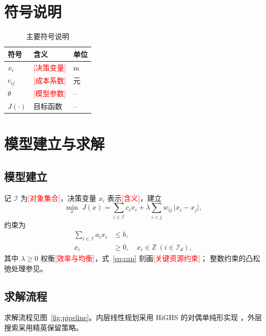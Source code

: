 \documentclass[UTF8, zihao=-4, fontset=windows, a4paper]{ctexart}
\newcommand{\todo}[1]{\textcolor{red}{[#1]}}   %
\begin{document}
\section{符号说明}
\begin{table}[htbp]
  \centering
  \caption{主要符号说明}
  \label{tab:notation}
  \begin{tabular}{@{}lll@{}}
    \toprule
    符号 & 含义 & 单位 \\
    \midrule
    $x_{i}$    & \todo{决策变量}   & \si{\metre} \\
    $c_{ij}$   & \todo{成本系数}   & 元 \\
    $\theta$   & \todo{模型参数}   & -- \\
    $J(\cdot)$ & 目标函数          & -- \\
    \bottomrule
  \end{tabular}
\end{table}

\section{模型建立与求解}

\subsection{模型建立}
记 $\mathcal{I}$ 为\todo{对象集合}，决策变量 $x_i$ 表示\todo{含义}，建立
\begin{equation}
  \min_{x}\; J(x)=\sum_{i\in\mathcal{I}} c_{i}x_{i}
      +\lambda\sum_{i<j} w_{ij}\,\lvert x_{i}-x_{j}\rvert ,
  \label{eq:obj}
\end{equation}
约束为
\begin{align}
  \sum_{i\in\mathcal{I}} a_{i}x_{i} &\le b, \label{eq:cap}\\
  x_{i} &\ge 0,\quad x_{i}\in\mathbb{Z}\ (i\in\mathcal{I}_{d}),
  \label{eq:int}
\end{align}
其中 $\lambda\ge0$ 权衡\todo{效率与均衡}，式~\eqref{eq:cap} 刻画\todo{关键资源约束}；
整数约束的凸松弛处理参见\cite{boyd2004convex}。

\subsection{求解流程}
求解流程见图~\ref{fig:pipeline}。内层线性规划采用 HiGHS 的对偶单纯形实现
\cite{huangfu2018parallelizing}，外层搜索采用精英保留策略\cite{deb2002nsga2}。
\end{document}
